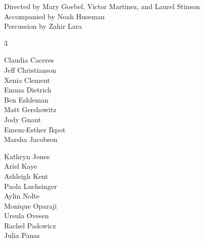 \documentclass{article}[10pt]
\begin{document}
\begin{center}
\begin{minipage}{117mm}
\begin{center}
{                    \begin{normalsize}
                        Directed by
                        Mary Goebel,
                        Victor Martinez,
                        and
                        Laurel Stinson\\
                        Accompanied by Noah Huseman\\
                        Percussion by Zahir Lara

                    \end{normalsize}

                    \vspace{-0.1in}

                    \begin{multicols*}{3}
                        \begin{center}
                            \begin{normalsize}
                                {Claudia Caceres}\\
                                {Jeff Christianson}\\
                            {Xenia Clement}\\
                            {Emma Dietrich}\\
                            {Ben Eshleman}\\
                            {Matt Gershowitz}\\
                            {Jody Gnant}\\
                            {Emem-Esther Ikpot}\\
                            {Marsha Jacobson}\vfill\null
                                \columnbreak

                                {Kathryn Jones}\\
                                {Ariel Kaye}\\
                                {Ashleigh Kent}\\
                                {Paola Luchsinger}\\
                                {Aylin Nolte}\\
                                {Monique Oparaji}\\
                                {Ursula Ovesen}\\
                                {Rachel Padowicz}\\
                                {Julia Panas}\vfill\null
                                \columnbreak


\end{normalsize}
\end{center}
\end{multicols*}}
\end{center}
\end{minipage}
\end{center}
\end{document}
